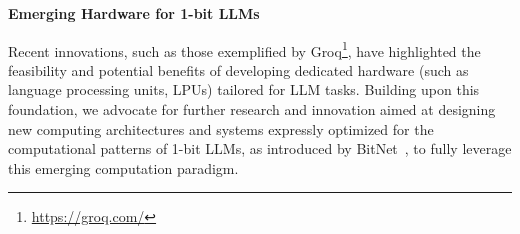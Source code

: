 \textbf{Emerging Hardware for 1-bit LLMs}

Recent innovations, such as those exemplified by Groq\footnote{\url{https://groq.com/}}, have highlighted the feasibility and potential benefits of developing dedicated hardware (such as language processing units, LPUs) tailored for LLM tasks. Building upon this foundation, we advocate for further research and innovation aimed at designing new computing architectures and systems expressly optimized for the computational patterns of 1-bit LLMs, as introduced by BitNet~\cite{bitnet}, to fully leverage this emerging computation paradigm.

